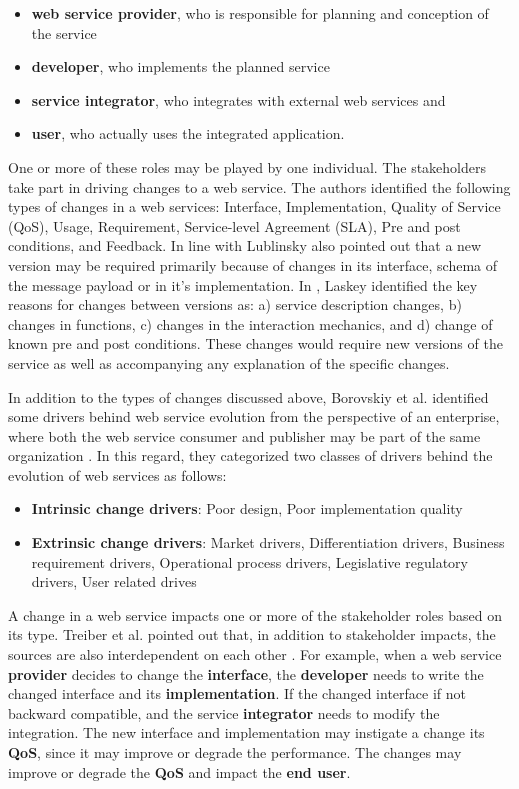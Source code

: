 \documentclass[runningheads,a4paper]{llncs}
\begin{document}
\begin{itemize}
  \item \textbf{web service provider}, who is responsible for planning and conception of the service
  \item \textbf{developer}, who implements the planned service
  \item \textbf{service integrator}, who integrates with external web services and
  \item \textbf{user}, who actually uses the integrated application.
\end{itemize}

One or more of these roles may be played by one individual. The stakeholders take part in driving changes to a web service. The authors identified the following types of changes in a web services: Interface, Implementation, Quality of Service (QoS), Usage, Requirement, Service-level Agreement (SLA), Pre and post conditions, and Feedback. In line with \cite{treiber2009analyzing}  Lublinsky also pointed out that a new version may be required primarily because of changes in its interface, schema of the message payload or in it’s implementation. In \cite{laskey2008considerations}, Laskey identified the key reasons for changes between versions as: a) service description changes, b) changes in functions, c) changes in the interaction mechanics, and d) change of known pre and post conditions. These changes would require new versions of the service as well as accompanying any explanation of the specific changes.

In addition to the types of changes discussed above, Borovskiy et al. identified some drivers behind web service evolution from the perspective of an enterprise, where both the web service consumer and publisher may be part of the same organization \cite{borovskiy2008evolution}. In this regard, they categorized two classes of drivers behind the evolution of web services as follows:

\begin{itemize}
  \item \textbf{Intrinsic change drivers}: Poor design, Poor implementation quality
  \item \textbf{Extrinsic change drivers}: Market drivers, Differentiation drivers, Business requirement drivers, Operational process drivers, Legislative regulatory drivers, User related drives
\end{itemize}


A change in a web service impacts one or more of the stakeholder roles based on its type. Treiber et al. pointed out that, in addition to stakeholder impacts, the sources are also interdependent on each other \cite{treiber2009analyzing}. For example, when a web service \textbf{provider} decides to change the \textbf{interface}, the \textbf{developer} needs to write the changed interface and its \textbf{implementation}. If the changed interface if not backward compatible, and the service \textbf{integrator} needs to modify the integration. The new interface and implementation may instigate a change its \textbf{QoS}, since it may improve or degrade the performance. The changes may improve or degrade the \textbf{QoS} and impact the \textbf{end user}.
\end{document}
